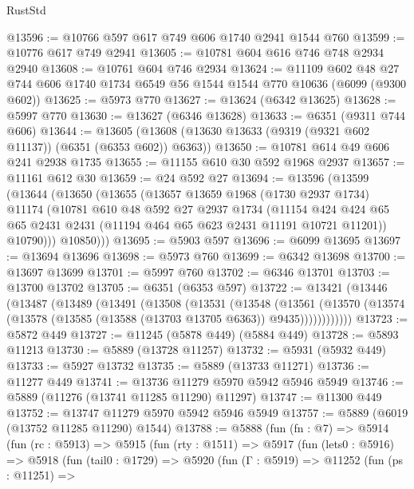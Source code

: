 \begin{lexlean}{RustStd}
\begin{coremodule}
@13596 := @10766 @597 @617 @749 @606 @1740 @2941 @1544 @760
@13599 := @10776 @617 @749 @2941
@13605 := @10781 @604 @616 @746 @748 @2934 @2940
@13608 := @10761 @604 @746 @2934
@13624 := @11109
    @602
    @48
    @27
    @744
    @606
    @1740
    @1734
    @6549
    @56
    @1544
    @1544
    @770
    @10636
    (@6099 (@9300 @602))
@13625 := @5973 @770
@13627 := @13624 (@6342 @13625)
@13628 := @5997 @770
@13630 := @13627 (@6346 @13628)
@13633 := @6351 (@9311 @744 @606)
@13644 := @13605 (@13608 (@13630 @13633 (@9319 (@9321 @602 @11137)) (@6351 (@6353 @602)) @6363))
@13650 := @10781 @614 @49 @606 @241 @2938 @1735
@13655 := @11155 @610 @30 @592 @1968 @2937
@13657 := @11161 @612 @30
@13659 := @24 @592 @27
@13694 := @13596
    (@13599
      (@13644
        (@13650
          (@13655
            (@13657
              @13659
              @1968
              (@1730 @2937 @1734)
              @11174
              (@10781
                @610
                @48
                @592
                @27
                @2937
                @1734
                (@11154
                  @424
                  @424
                  @65
                  @65
                  @2431
                  @2431
                  (@11194 @464 @65 @623 @2431 @11191 @10721 @11201))
                @10790)))
          @10850)))
@13695 := @5903 @597
@13696 := @6099 @13695
@13697 := @13694 @13696
@13698 := @5973 @760
@13699 := @6342 @13698
@13700 := @13697 @13699
@13701 := @5997 @760
@13702 := @6346 @13701
@13703 := @13700 @13702
@13705 := @6351 (@6353 @597)
@13722 := @13421
    (@13446
      (@13487
        (@13489
          (@13491
            (@13508
              (@13531
                (@13548
                  (@13561
                    (@13570 (@13574 (@13578 (@13585 (@13588 (@13703 @13705 @6363)) @9435))))))))))))
@13723 := @5872 @449
@13727 := @11245 (@5878 @449) (@5884 @449)
@13728 := @5893 @11213
@13730 := @5889 (@13728 @11257)
@13732 := @5931 (@5932 @449)
@13733 := @5927 @13732
@13735 := @5889 (@13733 @11271)
@13736 := @11277 @449
@13741 := @13736 @11279 @5970 @5942 @5946 @5949
@13746 := @5889 (@11276 (@13741 @11285 @11290) @11297)
@13747 := @11300 @449
@13752 := @13747 @11279 @5970 @5942 @5946 @5949
@13757 := @5889 (@6019 (@13752 @11285 @11290) @1544)
@13788 := @5888
    (fun (fn : @7) =>
    @5914
      (fun (rc : @5913) =>
      @5915
        (fun (rty : @1511) =>
        @5917
          (fun (lets0 : @5916) =>
          @5918
            (fun (tail0 : @1729) =>
            @5920
              (fun (Γ : @5919) =>
              @11252
                (fun (ps : @11251) =>

\end{coremodule}
\end{lexlean}

